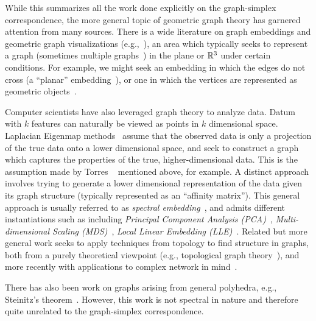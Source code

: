 While this summarizes all  the work done explicitly on the  graph-simplex correspondence, the  more general topic of geometric graph theory has  garnered attention from many sources.  
There is a wide literature on graph embeddings and geometric graph visualizations (e.g.,~\cite{tamassia2013handbook,brass2007simultaneous,kamada1989algorithm,fruchterman1991graph,de1990draw}), an area  which typically seeks to represent a  graph (sometimes multiple graphs~\cite{erten2005simultaneous,evans2016simultaneous,blasius2012simultaneous}) in the plane or $\mathbb{R}^3$ under  certain  conditions. For example, we might seek  an embedding in which the edges do not cross (a ``planar'' embedding~\cite{kant1993algorithms,nishizeki2004planar}), or one in which the vertices are represented as geometric objects~\cite{dean1997rectangle}. 


Computer scientists have  also leveraged graph theory to analyze data. Datum with $k$  features can naturally be viewed  as points in $k$ dimensional space. 
Laplacian Eigenmap methods~\cite{belkin2002laplacian} assume that the observed data is only a projection of the true data onto  a lower dimensional space, and seek  to construct a graph which  captures the properties  of the true, higher-dimensional data. This is the assumption made by Torres \etal~\cite{torres2019geometric} mentioned  above, for example. A distinct approach involves trying to generate a lower dimensional representation of the  data given its graph structure  (typically represented as an ``affinity matrix''). This general approach is usually referred to as \emph{spectral embedding}~\cite{brand2003unifying,bengio2004learning}, and admits different instantiations such as  
including \emph{Principal Component Analysis (PCA)}~\cite{jolliffe2011principal}, 
\emph{Multi-dimensional Scaling (MDS)}~\cite{kruskal1978multidimensional,cox2000multidimensional}, 
\emph{Local  Linear Embedding (LLE)}~\cite{roweis2000nonlinear}. 
Related but more general work seeks  to apply techniques from topology to  find structure in graphs, both from a purely theoretical viewpoint  (e.g., topological  graph theory~\cite{gross2001topological}),  and more recently with applications to complex network in mind~\cite{salnikov2018simplicial,wu2015emergent}. 

There has also been work on graphs arising from general polyhedra, e.g., Steinitz's theorem~\cite{steinitz1922polyeder}. However, this work is not spectral in nature and therefore quite unrelated to the graph-simplex  correspondence. 

